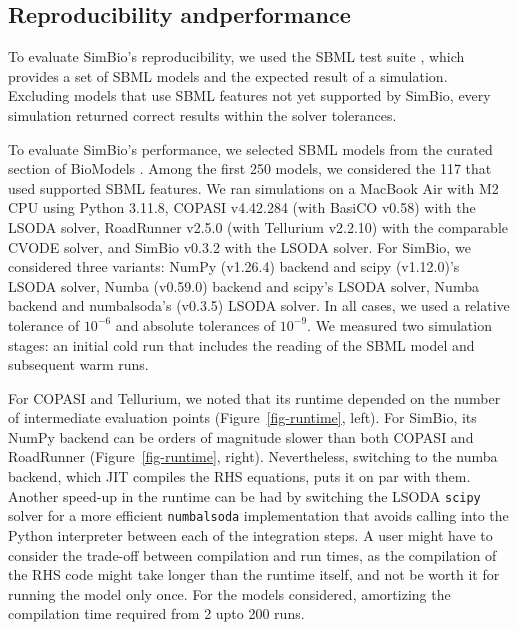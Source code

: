 \documentclass{article}
\begin{document}
\hypertarget{reproducibility-and-performance}{
  \subsection{Reproducibility andperformance}
  \label{reproducibility-and-performance}
}

To evaluate SimBio's reproducibility,
we used the \ac{SBML} test suite \cite{SBMLTestSuite},
which provides a set of \ac{SBML} models
and the expected result of a simulation.
Excluding models that use \ac{SBML} features not yet supported by SimBio,
every simulation returned correct results within the solver tolerances.

To evaluate SimBio's performance,
we selected \ac{SBML} models from the curated section of BioModels \cite{malik-sheriffBioModels15Years2020}.
Among the first 250 models,
we considered the 117 that used supported \ac{SBML} features.
We ran simulations
on a MacBook Air with M2 CPU
using Python 3.11.8,
COPASI v4.42.284
(with BasiCO v0.58) with the LSODA solver,
RoadRunner v2.5.0 (with Tellurium v2.2.10) with the comparable CVODE solver, and
SimBio v0.3.2 with the LSODA solver.
For SimBio, we considered three variants:
NumPy (v1.26.4) backend and scipy (v1.12.0)'s LSODA solver,
Numba (v0.59.0) backend and scipy's LSODA solver,
Numba backend and numbalsoda's (v0.3.5) LSODA solver.
In all cases, we used a relative tolerance of \(10^{-6}\) and absolute tolerances of \(10^{-9}\).
We measured two simulation stages:
an initial cold run that includes the reading of the \ac{SBML} model
and subsequent warm runs.

For COPASI and Tellurium,
we noted that its runtime depended on the number of intermediate evaluation points (Figure~\ref{fig-runtime}, left).
For SimBio,
its NumPy backend can be orders of magnitude slower than both COPASI and RoadRunner  (Figure~\ref{fig-runtime}, right).
Nevertheless, switching to the numba backend,
which \ac{JIT} compiles the \ac{RHS} equations,
puts it on par with them.
Another speed-up in the runtime can be had by switching the LSODA \texttt{scipy} solver
for a more efficient \texttt{numbalsoda} implementation that avoids calling into the Python interpreter
between each of the integration steps.
A user might have to consider the trade-off between compilation and run times,
as the compilation of the \ac{RHS} code might take longer than the runtime itself,
and not be worth it for running the model only once.
For the models considered,
amortizing the compilation time required from 2 upto 200 runs.
\end{document}
